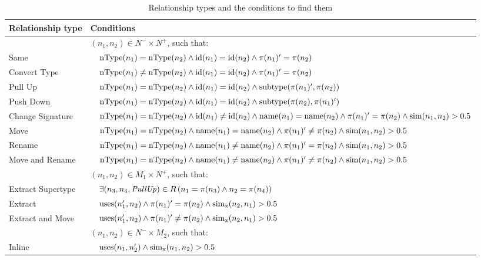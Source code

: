 \begin{table}[htbp]
\renewcommand{\arraystretch}{1.3}
\caption{Relationship types and the conditions to find them}
\label{TabRelationshipTypes}
\centering

\begin{tabular}{@{}lll@{}}
\toprule
Relationship type & \multicolumn{2}{l}{Conditions} \\
\midrule
& \multicolumn{2}{l}{$(n_1, n_2) \in N^- \times N^+$, such that:}\\
Same & & $\operatorname{nType}(n_1) = \operatorname{nType}(n_2) \land \operatorname{id}(n_1) = \operatorname{id}(n_2) \land \operatorname{\pi}(n_1)' = \operatorname{\pi}(n_2)$ \\
Convert Type & & $\operatorname{nType}(n_1) \neq \operatorname{nType}(n_2) \land \operatorname{id}(n_1) = \operatorname{id}(n_2) \land \operatorname{\pi}(n_1)' = \operatorname{\pi}(n_2)$ \\
Pull Up & & $\operatorname{nType}(n_1) = \operatorname{nType}(n_2) \land \operatorname{id}(n_1) = \operatorname{id}(n_2) \land \operatorname{subtype}(\operatorname{\pi}(n_1)', \operatorname{\pi}(n_2))$ \\
Push Down & & $\operatorname{nType}(n_1) = \operatorname{nType}(n_2) \land \operatorname{id}(n_1) = \operatorname{id}(n_2) \land \operatorname{subtype}(\operatorname{\pi}(n_2), \operatorname{\pi}(n_1)')$ \\
Change Signature & & $\operatorname{nType}(n_1) = \operatorname{nType}(n_2) \land \operatorname{id}(n_1) \neq \operatorname{id}(n_2) \land \operatorname{name}(n_1) = \operatorname{name}(n_2) \land \operatorname{\pi}(n_1)' = \operatorname{\pi}(n_2) \land \operatorname{sim}(n_1, n_2) > 0.5$ \\
Move & & $\operatorname{nType}(n_1) = \operatorname{nType}(n_2) \land \operatorname{name}(n_1) = \operatorname{name}(n_2) \land \operatorname{\pi}(n_1)' \neq \operatorname{\pi}(n_2) \land \operatorname{sim}(n_1, n_2) > 0.5$ \\
Rename & & $\operatorname{nType}(n_1) = \operatorname{nType}(n_2) \land \operatorname{name}(n_1) \neq \operatorname{name}(n_2) \land \operatorname{\pi}(n_1)' = \operatorname{\pi}(n_2) \land \operatorname{sim}(n_1, n_2) > 0.5$ \\
Move and Rename & & $\operatorname{nType}(n_1) = \operatorname{nType}(n_2) \land \operatorname{name}(n_1) \neq \operatorname{name}(n_2) \land \operatorname{\pi}(n_1)' \neq \operatorname{\pi}(n_2) \land \operatorname{sim}(n_1, n_2) > 0.5$ \\
\addlinespace
& \multicolumn{2}{l}{$(n_1, n_2) \in M_1 \times N^+$, such that:}\\
Extract Supertype & & $\exists (n_3, n_4, \mathit{PullUp}) \in R\, (n_1 = \operatorname{\pi}(n_3) \land n_2 = \operatorname{\pi}(n_4))$ \\
Extract & & $\operatorname{uses}(n_1', n_2) \land \operatorname{\pi}(n_1)' = \operatorname{\pi}(n_2) \land \operatorname{sim_{x}}(n_2, n_1) > 0.5$ \\
Extract and Move & & $\operatorname{uses}(n_1', n_2) \land \operatorname{\pi}(n_1)' \neq \operatorname{\pi}(n_2) \land \operatorname{sim_{x}}(n_2, n_1) > 0.5$ \\
\addlinespace
& \multicolumn{2}{l}{$(n_1, n_2) \in N^- \times M_2$, such that:}\\
Inline & & $\operatorname{uses}(n_1, n_2') \land \operatorname{sim_{x}}(n_1, n_2) > 0.5$ \\
\bottomrule
\end{tabular}


\end{table}
